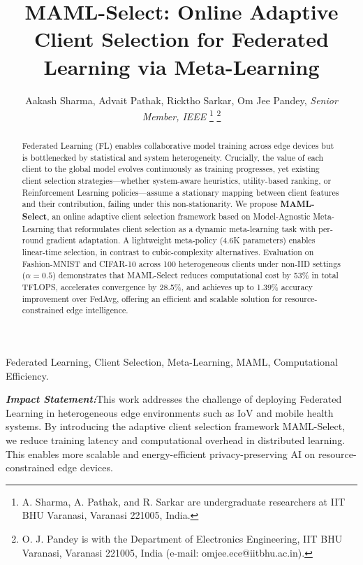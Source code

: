 \documentclass[journal]{IEEEtran}
\begin{document}
\title{MAML-Select: Online Adaptive Client Selection for Federated Learning via Meta-Learning}

\author{Aakash Sharma, Advait Pathak, Ricktho Sarkar, Om Jee Pandey, \textit{Senior Member, IEEE}
\thanks{A. Sharma, A. Pathak, and R. Sarkar are undergraduate researchers at IIT BHU Varanasi, Varanasi 221005, India.}
\thanks{O. J. Pandey is with the Department of Electronics Engineering, IIT BHU Varanasi, Varanasi 221005, India (e-mail: omjee.ece@iitbhu.ac.in).}}

\maketitle

\begin{abstract}
Federated Learning (FL) enables collaborative model training across edge devices but is bottlenecked by statistical and system heterogeneity. Crucially, the value of each client to the global model evolves continuously as training progresses, yet existing client selection strategies---whether system-aware heuristics, utility-based ranking, or Reinforcement Learning policies---assume a stationary mapping between client features and their contribution, failing under this non-stationarity. We propose \textbf{MAML-Select}, an online adaptive client selection framework based on Model-Agnostic Meta-Learning that reformulates client selection as a dynamic meta-learning task with per-round gradient adaptation. A lightweight meta-policy (4.6K parameters) enables linear-time selection, in contrast to cubic-complexity alternatives. Evaluation on Fashion-MNIST and CIFAR-10 across 100 heterogeneous clients under non-IID settings ($\alpha = 0.5$) demonstrates that MAML-Select reduces computational cost by 53\% in total TFLOPS, accelerates convergence by 28.5\%, and achieves up to 1.39\% accuracy improvement over FedAvg, offering an efficient and scalable solution for resource-constrained edge intelligence.
\end{abstract}

\begin{IEEEkeywords}
Federated Learning, Client Selection, Meta-Learning, MAML, Computational Efficiency.
\end{IEEEkeywords}

\medskip
\noindent \textbf{\textit{Impact Statement:}}This work addresses the challenge of deploying Federated Learning in heterogeneous edge environments such as IoV and mobile health systems. By introducing the adaptive client selection framework MAML-Select, we reduce training latency and computational overhead in distributed learning. This enables more scalable and energy-efficient privacy-preserving AI on resource-constrained edge devices.
\medskip
\end{document}
